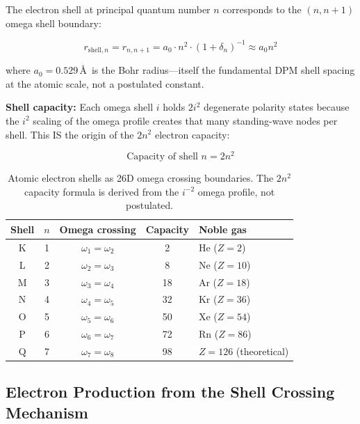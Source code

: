 \documentclass[12pt,a4paper]{article}
\begin{document}
The electron shell at principal quantum number $n$ corresponds to the
$(n, n{+}1)$ omega shell boundary:

\begin{equation}
  r_{\text{shell},n} = r_{n, n+1} = a_0 \cdot n^2 \cdot (1+\delta_n)^{-1}
  \approx a_0 n^2
  \label{eq:electron_shell}
\end{equation}

where $a_0 = 0.529\,$\AA\ is the Bohr radius---itself the fundamental DPM shell
spacing at the atomic scale, not a postulated constant.

\noindent\textbf{Shell capacity:} Each omega shell $i$ holds $2i^2$ degenerate
polarity states because the $i^2$ scaling of the omega profile creates that many
standing-wave nodes per shell.  This IS the origin of the $2n^2$ electron capacity:

\begin{equation}
  \text{Capacity of shell } n = 2n^2
  \label{eq:shell_capacity}
\end{equation}

\begin{table}[H]
\centering
\begin{tabular}{@{}ccccl@{}}
\toprule
\textbf{Shell} & $n$ & \textbf{Omega crossing} & \textbf{Capacity} & \textbf{Noble gas} \\
\midrule
K & 1 & $\omega_1 = \omega_2$ & 2  & He ($Z=2$)  \\
L & 2 & $\omega_2 = \omega_3$ & 8  & Ne ($Z=10$) \\
M & 3 & $\omega_3 = \omega_4$ & 18 & Ar ($Z=18$) \\
N & 4 & $\omega_4 = \omega_5$ & 32 & Kr ($Z=36$) \\
O & 5 & $\omega_5 = \omega_6$ & 50 & Xe ($Z=54$) \\
P & 6 & $\omega_6 = \omega_7$ & 72 & Rn ($Z=86$) \\
Q & 7 & $\omega_7 = \omega_8$ & 98 & $Z=126$ (theoretical) \\
\bottomrule
\end{tabular}
\caption{Atomic electron shells as 26D omega crossing boundaries.
The $2n^2$ capacity formula is derived from the $i^{-2}$ omega profile, not
postulated.}
\label{tab:electron_shells}
\end{table}

\subsection{Electron Production from the Shell Crossing Mechanism}
\label{sec:electrons}
\end{document}
